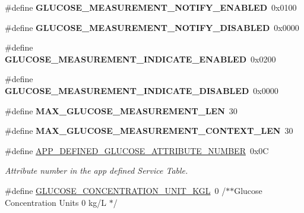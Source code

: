 \begin{DoxyCompactItemize}
\item 
\#define {\bfseries G\+L\+U\+C\+O\+S\+E\+\_\+\+M\+E\+A\+S\+U\+R\+E\+M\+E\+N\+T\+\_\+\+N\+O\+T\+I\+F\+Y\+\_\+\+E\+N\+A\+B\+L\+ED}~0x0100\hypertarget{group___b_l_e___g_s_ga309ba0cfc7aabc6685ac189ec225af79}{}\label{group___b_l_e___g_s_ga309ba0cfc7aabc6685ac189ec225af79}

\item 
\#define {\bfseries G\+L\+U\+C\+O\+S\+E\+\_\+\+M\+E\+A\+S\+U\+R\+E\+M\+E\+N\+T\+\_\+\+N\+O\+T\+I\+F\+Y\+\_\+\+D\+I\+S\+A\+B\+L\+ED}~0x0000\hypertarget{group___b_l_e___g_s_ga769d429ecb217ecdc13f8277fc40b72f}{}\label{group___b_l_e___g_s_ga769d429ecb217ecdc13f8277fc40b72f}

\item 
\#define {\bfseries G\+L\+U\+C\+O\+S\+E\+\_\+\+M\+E\+A\+S\+U\+R\+E\+M\+E\+N\+T\+\_\+\+I\+N\+D\+I\+C\+A\+T\+E\+\_\+\+E\+N\+A\+B\+L\+ED}~0x0200\hypertarget{group___b_l_e___g_s_ga0ad6f1d9b710088528b557a33a0bbc20}{}\label{group___b_l_e___g_s_ga0ad6f1d9b710088528b557a33a0bbc20}

\item 
\#define {\bfseries G\+L\+U\+C\+O\+S\+E\+\_\+\+M\+E\+A\+S\+U\+R\+E\+M\+E\+N\+T\+\_\+\+I\+N\+D\+I\+C\+A\+T\+E\+\_\+\+D\+I\+S\+A\+B\+L\+ED}~0x0000\hypertarget{group___b_l_e___g_s_ga8a7ce95f7736c0c814b5c6f1ebdb3fa1}{}\label{group___b_l_e___g_s_ga8a7ce95f7736c0c814b5c6f1ebdb3fa1}

\item 
\#define {\bfseries M\+A\+X\+\_\+\+G\+L\+U\+C\+O\+S\+E\+\_\+\+M\+E\+A\+S\+U\+R\+E\+M\+E\+N\+T\+\_\+\+L\+EN}~30\hypertarget{group___b_l_e___g_s_ga6619cea161cec079694f3b8529bbbee8}{}\label{group___b_l_e___g_s_ga6619cea161cec079694f3b8529bbbee8}

\item 
\#define {\bfseries M\+A\+X\+\_\+\+G\+L\+U\+C\+O\+S\+E\+\_\+\+M\+E\+A\+S\+U\+R\+E\+M\+E\+N\+T\+\_\+\+C\+O\+N\+T\+E\+X\+T\+\_\+\+L\+EN}~30\hypertarget{group___b_l_e___g_s_ga183c0383dd4cf191f49c253f9bf0e62d}{}\label{group___b_l_e___g_s_ga183c0383dd4cf191f49c253f9bf0e62d}

\item 
\#define \hyperlink{group___b_l_e___g_s_ga3cbeefe4c72fb18c2f6cb7af3d8da434}{A\+P\+P\+\_\+\+D\+E\+F\+I\+N\+E\+D\+\_\+\+G\+L\+U\+C\+O\+S\+E\+\_\+\+A\+T\+T\+R\+I\+B\+U\+T\+E\+\_\+\+N\+U\+M\+B\+ER}~0x0C\hypertarget{group___b_l_e___g_s_ga3cbeefe4c72fb18c2f6cb7af3d8da434}{}\label{group___b_l_e___g_s_ga3cbeefe4c72fb18c2f6cb7af3d8da434}

\begin{DoxyCompactList}\small\item\em Attribute number in the app defined Service Table. \end{DoxyCompactList}\item 
\#define \hyperlink{group___b_l_e___g_s_gaf06c0487f1d16b54de92675226172ff1}{G\+L\+U\+C\+O\+S\+E\+\_\+\+C\+O\+N\+C\+E\+N\+T\+R\+A\+T\+I\+O\+N\+\_\+\+U\+N\+I\+T\+\_\+\+K\+GL}~0			/$\ast$$\ast$Glucose Concentration Units	 0	kg/L	 $\ast$/\hypertarget{group___b_l_e___g_s_gaf06c0487f1d16b54de92675226172ff1}{}\label{group___b_l_e___g_s_gaf06c0487f1d16b54de92675226172ff1}


\end{DoxyCompactItemize}

